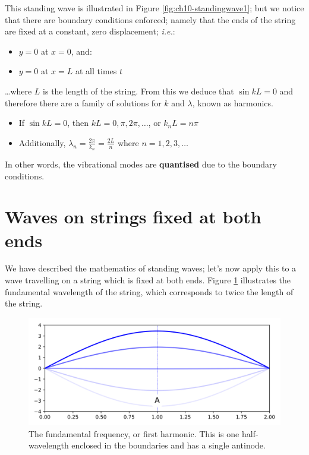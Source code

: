 \documentclass[
]{book}
\providecommand{\tightlist}{%
  \setlength{\itemsep}{0pt}\setlength{\parskip}{0pt}}
\begin{document}
This standing wave is illustrated in Figure \ref{fig:ch10-standingwave1}; but we notice that there are boundary conditions enforced; namely that the ends of the string are fixed at a constant, zero displacement; \emph{i.e.}:

\begin{itemize}
\tightlist
\item
  \(y = 0\) at \(x = 0\), and:
\item
  \(y = 0\) at \(x = L\) at all times \(t\)
\end{itemize}

\ldots where \(L\) is the length of the string. From this we deduce that \(\sin kL = 0\) and therefore there are a family of solutions for \(k\) and \(\lambda\), known as harmonics.

\begin{itemize}
\tightlist
\item
  If \(\sin kL = 0\), then \(kL = 0, \pi, 2\pi, \dots\), or \(k_n L = n\pi\)
\item
  Additionally, \(\lambda_n = \frac{2\pi}{k_n} = \frac{2L}{n}\) where \(n = 1, 2, 3, \dots\)
\end{itemize}

In other words, the vibrational modes are \textbf{quantised} due to the boundary conditions.

\hypertarget{sec-ch10-fixedstring1}{%
\section{Waves on strings fixed at both ends}\label{sec-ch10-fixedstring1}}

We have described the mathematics of standing waves; let's now apply this to a wave travelling on a string which is fixed at both ends. Figure \ref{fig:ch10-stringfundamental1} illustrates the fundamental wavelength of the string, which corresponds to twice the length of the string.

\begin{figure}

{\centering \includegraphics[width=0.7\linewidth]{visualisations/ch10-standingwave_stages-n1} 

}

\caption{The fundamental frequency, or first harmonic. This is one half-wavelength enclosed in the boundaries and has a single antinode.}\label{fig:ch10-stringfundamental1}
\end{figure}
\end{document}
